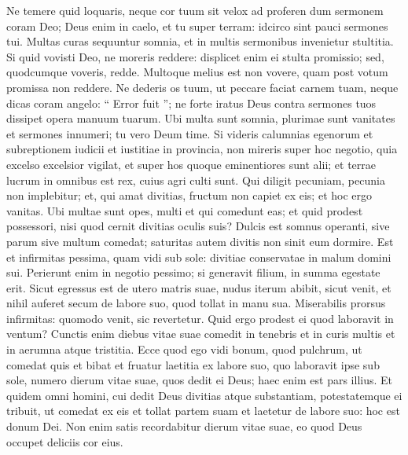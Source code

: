 \begin{biblechapter}
\begin{biblechapter}
\begin{biblechapter}
\begin{biblechapter}
\begin{biblechapter}
\verse Ne temere quid loquaris, neque cor tuum sit velox ad proferen dum sermonem coram Deo; Deus enim in caelo, et tu super terram: idcirco sint pauci sermones tui.
 \verse Multas curas sequuntur somnia,
 et in multis sermonibus invenietur stultitia.
 \verse Si quid vovisti Deo, ne moreris reddere: displicet enim ei stulta promissio; sed, quodcumque voveris, redde. 
\verse Multoque melius est non vovere, quam post votum promissa non reddere. 
\verse Ne dederis os tuum, ut peccare faciat carnem tuam, neque dicas coram angelo: “ Error fuit ”; ne forte iratus Deus contra sermones tuos dissipet opera manuum tuarum. 
\verse Ubi multa sunt somnia, plurimae sunt vanitates et sermones innumeri; tu vero Deum time.
 \verse Si videris calumnias egenorum et subreptionem iudicii et iustitiae in provincia, non mireris super hoc negotio, quia excelso excelsior vigilat, et super hos quoque eminentiores sunt alii; 
\verse et terrae lucrum in omnibus est rex, cuius agri culti sunt. 
\verse Qui diligit pecuniam, pecunia non implebitur; et, qui amat divitias, fructum non capiet ex eis; et hoc ergo vanitas. 
\verse Ubi multae sunt opes, multi et qui comedunt eas; et quid prodest possessori, nisi quod cernit divitias oculis suis? 
\verse Dulcis est somnus operanti,
 sive parum sive multum comedat;
 saturitas autem divitis
 non sinit eum dormire.
 \verse Est et infirmitas pessima, quam vidi sub sole: divitiae conservatae in malum domini sui. 
\verse Perierunt enim in negotio pessimo; si generavit filium, in summa egestate erit. 
\verse Sicut egressus est de utero matris suae, nudus iterum abibit, sicut venit, et nihil auferet secum de labore suo, quod tollat in manu sua. 
\verse Miserabilis prorsus infirmitas: quomodo venit, sic revertetur. Quid ergo prodest ei quod laboravit in ventum? 
\verse Cunctis enim diebus vitae suae comedit in tenebris et in curis multis et in aerumna atque tristitia. 
 \verse Ecce quod ego vidi bonum, quod pulchrum, ut comedat quis et bibat et fruatur laetitia ex labore suo, quo laboravit ipse sub sole, numero dierum vitae suae, quos dedit ei Deus; haec enim est pars illius. 
\verse Et quidem omni homini, cui dedit Deus divitias atque substantiam, potestatemque ei tribuit, ut comedat ex eis et tollat partem suam et laetetur de labore suo: hoc est donum Dei. 
\verse Non enim satis recordabitur dierum vitae suae, eo quod Deus occupet deliciis cor eius.
 

\end{biblechapter}
\end{biblechapter}
\end{biblechapter}
\end{biblechapter}
\end{biblechapter}
